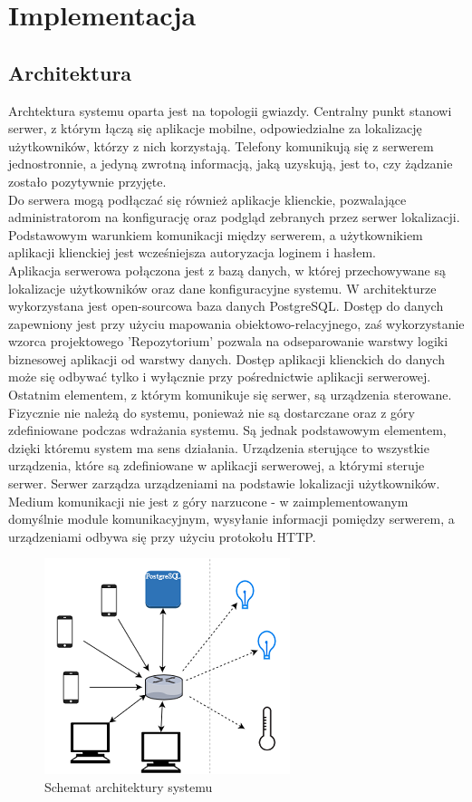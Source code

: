 \chapter{Implementacja}
\label{cha:implementacja}
\section{Architektura}
Archtektura systemu oparta jest na topologii gwiazdy. Centralny punkt stanowi serwer, z którym łączą się aplikacje mobilne, odpowiedzialne za lokalizację użytkowników, którzy z nich korzystają. Telefony komunikują się z serwerem jednostronnie, a jedyną zwrotną informacją, jaką uzyskują, jest to, czy żądzanie zostało pozytywnie przyjęte.\\
Do serwera mogą podłączać się również aplikacje klienckie, pozwalające administratorom na konfigurację oraz podgląd zebranych przez serwer lokalizacji. Podstawowym warunkiem komunikacji między serwerem, a użytkownikiem aplikacji klienckiej jest wcześniejsza autoryzacja loginem i hasłem.\\
Aplikacja serwerowa połączona jest z bazą danych, w której przechowywane są lokalizacje użytkowników oraz dane konfiguracyjne systemu. W architekturze wykorzystana jest open-sourcowa baza danych PostgreSQL. Dostęp do danych zapewniony jest przy użyciu mapowania obiektowo-relacyjnego, zaś wykorzystanie wzorca projektowego 'Repozytorium' pozwala na odseparowanie warstwy logiki biznesowej aplikacji od warstwy danych. Dostęp aplikacji klienckich do danych może się odbywać tylko i wyłącznie przy pośrednictwie aplikacji serwerowej.\\
Ostatnim elementem, z którym komunikuje się serwer, są urządzenia sterowane. Fizycznie nie należą do systemu, ponieważ nie są dostarczane oraz z góry zdefiniowane podczas wdrażania systemu. Są jednak podstawowym elementem, dzięki któremu system ma sens działania. Urządzenia sterujące to wszystkie urządzenia, które są zdefiniowane w aplikacji serwerowej, a którymi steruje serwer. Serwer zarządza urządzeniami na podstawie lokalizacji użytkowników. Medium komunikacji nie jest z góry narzucone - w zaimplementowanym domyślnie module komunikacyjnym, wysyłanie informacji pomiędzy serwerem, a urządzeniami odbywa się przy użyciu protokołu HTTP.
\begin{figure}[H]			
	\centering
	\caption{Schemat architektury systemu}
	\includegraphics{schemat_architektury}
\end{figure}
